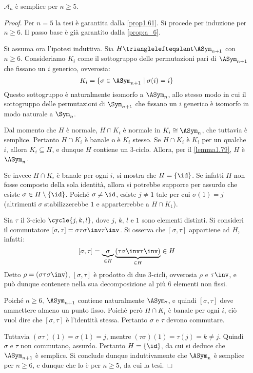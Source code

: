 \documentclass[11pt]{scrartcl}
\begin{document}
	\begin{theorem}
		\label{th:an_semplice}
		$\mathcal{A}_n$ è semplice per $n \geq 5$.
	\end{theorem}
	
	\begin{proof}
		Per $n = 5$ la tesi è garantita dalla \autoref{prop1.61}. Si procede per
		induzione per $n \geq 6$. Il passo base è già garantito dalla \autoref{prop:a_6}.
		\medskip
		
		Si assuma ora l'ipotesi induttiva. Sia $H \trianglelefteqslant \ASym_{n+1}$
		con $n \geq 6$. Consideriamo $K_i$ come il sottogruppo delle permutazioni pari
		di $\ASym_{n+1}$ che fissano un $i$ generico, ovverosia:
		\[ K_i = \{ \sigma \in \ASym_{n+1} \mid \sigma(i) = i \} \]
		Questo sottogruppo è naturalmente isomorfo a $\ASym_n$, allo stesso modo in
		cui il sottogruppo delle permutazioni di $\Sym_{n+1}$ che fissano un $i$ generico
		è isomorfo in modo naturale a $\Sym_n$. \medskip
		
		
		Dal momento che $H$ è normale, $H \cap K_i$ è normale in $K_i \cong \ASym_n$, che
		tuttavia è semplice. Pertanto $H \cap K_i$ è banale o è $K_i$ stesso.
		Se $H \cap K_i$ è $K_i$ per un qualche $i$,
		allora $K_i \subseteq H$, e dunque $H$ contiene un
		$3$-ciclo. Allora, per il \autoref{lemma1.79}, $H$ è $\ASym_n$. \medskip
		
		
		Se invece $H \cap K_i$ è banale per ogni $i$, si mostra che $H = \{\id\}$.
		Se infatti $H$ non fosse composto della sola identità, allora si potrebbe supporre
		per assurdo che esiste $\sigma \in H \setminus \{\id\}$. Poiché $\sigma \neq \id$,
		esiste $j \neq 1$ tale per cui $\sigma(1) = j$ (altrimenti $\sigma$ stabilizzerebbe
		$1$ e apparterrebbe a $H \cap K_1$). \medskip
		
		
		Sia $\tau$ il $3$-ciclo $\cycle{j, k, l}$, dove $j$, $k$, $l$ e $1$ sono elementi
		distinti. Si consideri il commutatore $[\sigma, \tau] = \sigma \tau \sigma\inv \tau\inv$. Si osserva che $[\sigma, \tau]$ appartiene ad $H$, infatti:
		\[ [\sigma, \tau] = \underbrace{\sigma}_{\in H} \underbrace{(\tau \sigma\inv \tau\inv)}_{\in H} \in H \]
		Detto $\rho = (\sigma \tau \sigma\inv)$, $[\sigma, \tau]$ è prodotto di due
		$3$-cicli, ovverosia $\rho$ e $\tau\inv$, e può dunque contenere nella sua
		decomposizione al più $6$ elementi non fissi. \medskip
		

		Poiché $n \geq 6$, $\ASym_{n+1}$ contiene
		naturalmente $\ASym_{7}$, e quindi $[\sigma, \tau]$ deve ammettere almeno un
		punto fisso. Poiché però $H \cap K_i$ è banale per ogni $i$, ciò vuol dire
		che $[\sigma, \tau]$ è l'identità stessa. Pertanto $\sigma$ e $\tau$ devono
		commutare. \medskip
		
		
		Tuttavia $(\sigma \tau)(1) = \sigma(1) = j$, mentre $(\tau \sigma)(1) = \tau(j) =
		k \neq j$. Quindi $\sigma$ e $\tau$ non commutano, assurdo. Pertanto
		$H = \{\id\}$, da cui si deduce che $\ASym_{n+1}$ è semplice. Si conclude
		dunque induttivamente che $\ASym_n$ è semplice per $n \geq 6$, e dunque che
		lo è per $n \geq 5$, da cui la tesi.
	\end{proof}
	
\end{document}
